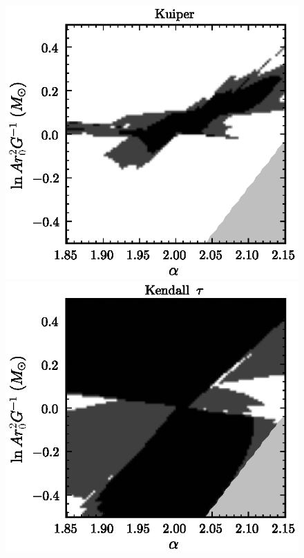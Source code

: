 \begin{figure}
\includegraphics[height=.2\textheight]{figs_solarsystem/freqKuiper.ps}
\includegraphics[height=.2\textheight]{figs_solarsystem/freqKendall.ps}\\[5pt]

\end{figure}
